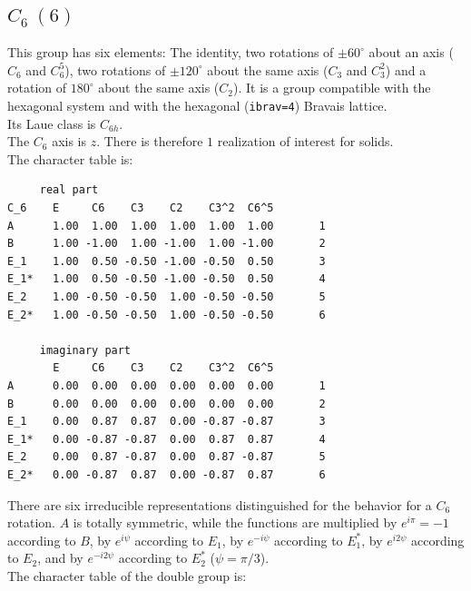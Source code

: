 \documentclass[12pt,a4paper]{article}
\begin{document}
\subsection{\color{web-blue}$C_6\ (6)$}
This group has six elements: The identity, two rotations of $\pm60^\circ$ 
about an axis ($C_6$ and $C_6^5$), two rotations of $\pm120^\circ$
about the same axis ($C_3$ and $C_3^2$) and a rotation of $180^\circ$ about 
the same axis ($C_2$).
It is a group compatible with the hexagonal system and with the
hexagonal (\texttt{ibrav=4}) Bravais lattice. \\ 
Its Laue class is $C_{6h}$. \\
The $C_6$ axis is $z$.
There is therefore $1$ realization of interest for solids. \\
The character table is:
\begin{verbatim}
     real part
C_6    E     C6    C3    C2    C3^2  C6^5 
A      1.00  1.00  1.00  1.00  1.00  1.00       1
B      1.00 -1.00  1.00 -1.00  1.00 -1.00       2
E_1    1.00  0.50 -0.50 -1.00 -0.50  0.50       3 
E_1*   1.00  0.50 -0.50 -1.00 -0.50  0.50       4
E_2    1.00 -0.50 -0.50  1.00 -0.50 -0.50       5
E_2*   1.00 -0.50 -0.50  1.00 -0.50 -0.50       6

     imaginary part
       E     C6    C3    C2    C3^2  C6^5 
A      0.00  0.00  0.00  0.00  0.00  0.00       1
B      0.00  0.00  0.00  0.00  0.00  0.00       2
E_1    0.00  0.87  0.87  0.00 -0.87 -0.87       3
E_1*   0.00 -0.87 -0.87  0.00  0.87  0.87       4
E_2    0.00  0.87 -0.87  0.00  0.87 -0.87       5
E_2*   0.00 -0.87  0.87  0.00 -0.87  0.87       6
\end{verbatim}
There are six irreducible representations distinguished for
the behavior for a $C_6$ rotation. $A$ is totally symmetric, while
the functions are multiplied by $e^{i\pi}=-1$ according
to $B$, by $e^{i\psi}$ according to $E_1$, by $e^{-i\psi}$ 
according to $E_1^*$, by $e^{i2\psi}$ according to $E_2$, and by $e^{-i2\psi}$
according to $E_2^*$ ($\psi=\pi/3$). \\
The character table of the double group is:
\end{document}
